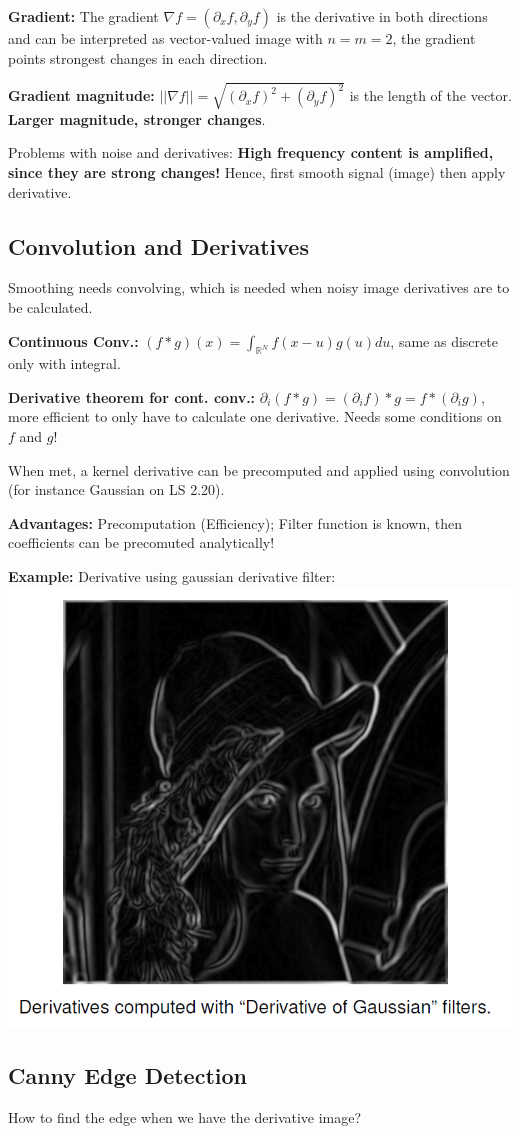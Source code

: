 \textbf{Gradient:} The gradient $\nabla f = (\partial_x f, \partial_y f)$ is the derivative in both directions and can be interpreted as vector-valued image with $n=m=2$, the gradient points strongest changes in each direction.

\textbf{Gradient magnitude:} $||\nabla f|| = \sqrt{(\partial_x f)^2 + (\partial_y f)^2}$ is the length of the vector. \textbf{Larger magnitude, stronger changes}.

Problems with noise and derivatives:\textbf{ High frequency content is amplified, since they are strong changes!} Hence, first smooth signal (image) then apply derivative.

\subsection{Convolution and Derivatives}

Smoothing needs convolving, which is needed when noisy image derivatives are to be calculated.

\textbf{Continuous Conv.:} $(f*g)(x) = \int_{\mathbb{R}^N} f(x-u)g(u) du$, same as discrete only with integral.

\textbf{Derivative theorem for cont. conv.:} $\partial_i (f*g) = (\partial_i f)*g = f * (\partial_i g)$, more efficient to only have to calculate one derivative. Needs some conditions on $f$ and $g$!

When met, a kernel derivative can be precomputed and applied using convolution (for instance Gaussian on LS 2.20).

\textbf{Advantages:} Precomputation (Efficiency); Filter function is known, then coefficients can be precomuted analytically!

\textbf{Example:} Derivative using gaussian derivative filter: \includegraphics[width=.3\textwidth]{images/chap3/der_gauss}

\subsection{Canny Edge Detection}

How to find the edge when we have the derivative image?


